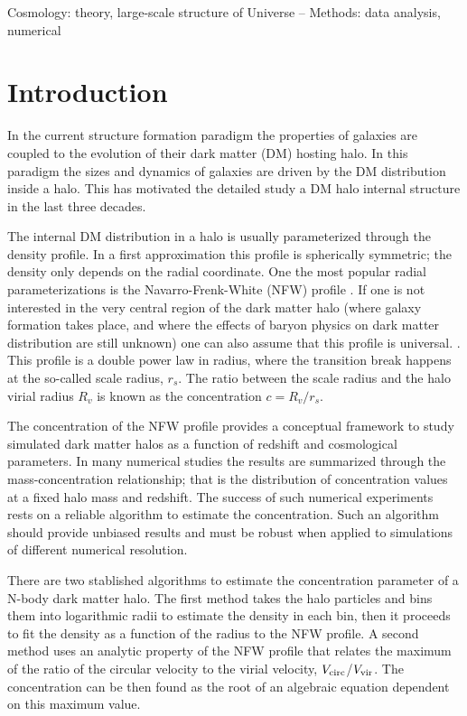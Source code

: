 \documentclass[a4,useAMS,usenatbib,usegraphicx]{mn2e}
\begin{document}
\begin{keywords}
Cosmology: theory, large-scale structure of Universe --
Methods: data analysis, numerical 
\end{keywords}


\section{Introduction}
\label{sec:introduction}
In the current structure formation paradigm the properties of galaxies
are coupled to the evolution of their dark matter (DM) hosting halo.
In this paradigm the sizes and dynamics of galaxies are driven by
the DM distribution inside a halo. This has motivated the detailed study
a DM halo internal structure in the last three decades. 

The internal DM distribution in a halo is usually parameterized
through the density profile.  
In a first approximation this profile is spherically symmetric; the
density only depends on the radial coordinate.  
One the most popular radial parameterizations is the
Navarro-Frenk-White (NFW) profile 
\citep{NFW}.   
If one is not interested in the very central region of the
dark matter halo (where galaxy formation takes place, and where the
effects of baryon physics on dark matter distribution are still 
unknown) one can also assume that this profile is universal.
\citep{Navarro2010}.  
 This profile is a double power law in radius, where the transition
break happens at the so-called scale radius, $r_s$.  
The ratio between the scale radius and the halo virial radius $R_v$ is
known as the concentration $c=R_v/r_s$. 


The concentration of the NFW profile provides a conceptual
framework to study simulated dark matter halos as a function of
redshift and cosmological parameters.
In many numerical studies 
\citep{Neto2007,Maccio2008,Duffy2008,Munoz2011,Prada2012,Ludlow2014} 
the results are summarized through the
mass-concentration relationship; that is the distribution of
concentration values at a fixed halo mass and redshift.
The success of such numerical experiments rests on a
reliable algorithm to estimate the concentration. 
Such an algorithm should provide unbiased results and must be robust
when applied to simulations of different numerical resolution.  

There are two stablished algorithms to estimate the concentration parameter
of a N-body dark matter halo. 
The first method takes the halo particles and bins them into
logarithmic radii to estimate the density in each bin, then it 
proceeds to fit the density as a function of the radius to the NFW
profile.  
A second method uses an analytic property of the NFW profile
that relates the maximum of the ratio of the circular velocity to the
virial velocity, $V_{\rm circ}$/$V_{\rm vir}$.  The concentration can
be then found as the root of an algebraic equation dependent on this
maximum value.  
\end{document}

